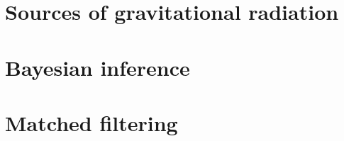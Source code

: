 \documentclass{kentigern}
\begin{document}
\section{Sources of gravitational radiation}
\label{sec:sources}




% 

% 

% 

% 



\section{Bayesian inference}
\label{sec:bayesian-inference}


\section{Matched filtering}
\label{sec:matched-filtering}

\end{document}
